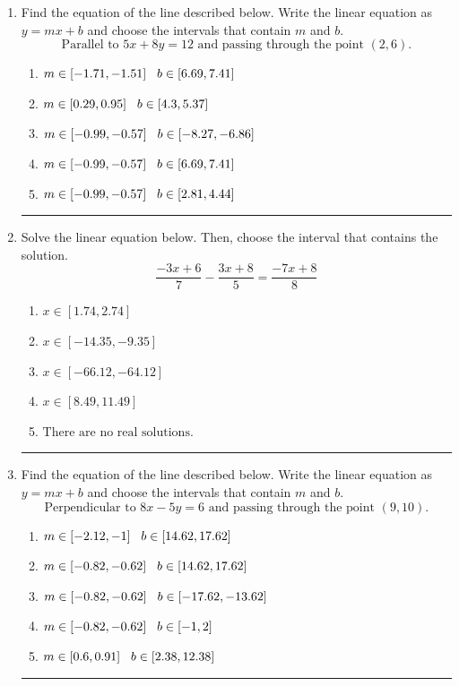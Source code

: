 \documentclass[14pt]{extbook}
\newcommand{\litem}[1]{\item#1\hspace*{-1cm}\rule{\textwidth}{0.4pt}}
\begin{document}
\begin{enumerate}
{\begin{enumerate}[label=\Alph*.]
\end{enumerate} }
\litem{
Find the equation of the line described below. Write the linear equation as $ y=mx+b $ and choose the intervals that contain $m$ and $b$.\[ \text{Parallel to } 5 x + 8 y = 12 \text{ and passing through the point } (2, 6). \]\begin{enumerate}[label=\Alph*.]
\item \( m \in [-1.71, -1.51] \hspace*{3mm} b \in [6.69, 7.41] \)
\item \( m \in [0.29, 0.95] \hspace*{3mm} b \in [4.3, 5.37] \)
\item \( m \in [-0.99, -0.57] \hspace*{3mm} b \in [-8.27, -6.86] \)
\item \( m \in [-0.99, -0.57] \hspace*{3mm} b \in [6.69, 7.41] \)
\item \( m \in [-0.99, -0.57] \hspace*{3mm} b \in [2.81, 4.44] \)

\end{enumerate} }
\litem{
Solve the linear equation below. Then, choose the interval that contains the solution.\[ \frac{-3x + 6}{7} - \frac{3x + 8}{5} = \frac{-7x + 8}{8} \]\begin{enumerate}[label=\Alph*.]
\item \( x \in [1.74, 2.74] \)
\item \( x \in [-14.35, -9.35] \)
\item \( x \in [-66.12, -64.12] \)
\item \( x \in [8.49, 11.49] \)
\item \( \text{There are no real solutions.} \)

\end{enumerate} }
\litem{
Find the equation of the line described below. Write the linear equation as $ y=mx+b $ and choose the intervals that contain $m$ and $b$.\[ \text{Perpendicular to } 8 x - 5 y = 6 \text{ and passing through the point } (9, 10). \]\begin{enumerate}[label=\Alph*.]
\item \( m \in [-2.12, -1] \hspace*{3mm} b \in [14.62, 17.62] \)
\item \( m \in [-0.82, -0.62] \hspace*{3mm} b \in [14.62, 17.62] \)
\item \( m \in [-0.82, -0.62] \hspace*{3mm} b \in [-17.62, -13.62] \)
\item \( m \in [-0.82, -0.62] \hspace*{3mm} b \in [-1, 2] \)
\item \( m \in [0.6, 0.91] \hspace*{3mm} b \in [2.38, 12.38] \)

\end{enumerate} }
\end{enumerate}
\end{document}
